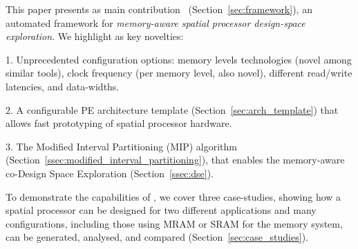 This paper presents as main contribution \frameworkname~(Section~\ref{sec:framework}), an automated framework for \textit{memory-aware spatial processor design-space exploration}. We highlight as key novelties:

1. Unprecedented configuration options: memory levels technologies (novel among similar tools), clock frequency (per memory level, also novel), different read/write latencies, and data-widths.

2. A configurable PE architecture template (Section~\ref{sec:arch_template}) that allows fast prototyping of spatial processor hardware.

3. The Modified Interval Partitioning (MIP) algorithm (Section~\ref{ssec:modified_interval_partitioning}), that enables the memory-aware co-Design Space Exploration (Section~\ref{ssec:dse}).

To demonstrate the capabilities of \frameworkname, we cover three case-studies, showing how a spatial processor can be designed for two different applications and many configurations, including those using MRAM or SRAM for the memory system, can be generated, analysed, and compared (Section~\ref{sec:case_studies}).




